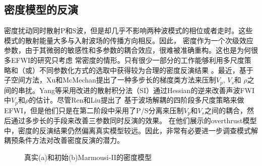 \subsection{密度模型的反演}
密度扰动同时散射P和S波，但是却几乎不影响两种波模式的相位或者走时。这些模式的散射能量大多与入射波场的传播方向相反\cite[]{wu.aki:1985,tarantola:1986}。因此，
密度作为一个次级效应参数，由于其微弱的敏感性和多参数的耦合效应\cite[]{tarantola:1986,forgues.lambare:1997}，很难被准确重构。这也是为何很多EFWI的研究只考虑
常密度的情形\cite[]{shipp:2002,sears2008,brossier2009}。只有很少一部分的工作能够利用多尺度策略和（或）不同参数化方式的选取中获得较为合理的密度反演结果
\cite{jeong2012full}。最近，基于子空间方法\cite[]{kennett:1988}，Xu和McMechan\cite{xu.mcmechan:2014}提出了一种多步长的梯度类方法来压制$V_p$, $V_s$和
$\rho$之间的串扰。Yang等\cite{Yang2016}采用改进的散射积分法（SI）通过Hessian的逆来改善声波FWI中$V_p$和$\rho$的估计。尽管Ren和Liu\cite{ren.liu:2016}提出了
基于波场解耦的四阶段多尺度策略来做EFWI，但是他们只是在第二阶段中采用了P/S分离来压制$V_p$和$V_s$之间的耦合，然后通过多步长的手段来改善三参数同时反演的效果。
在他们展示的overthrust模型中，密度的反演结果仍然偏离真实模型较远。因此，非常有必要进一步调查模式解耦预条件方法对改善密度反演的潜力。
\begin{figure}
    \begin{center}
    \caption{
		真实(a)和初始(b)Marmousi-II的密度模型
    }
    \label{fig:Marrho}
    \end{center}
\end{figure}

